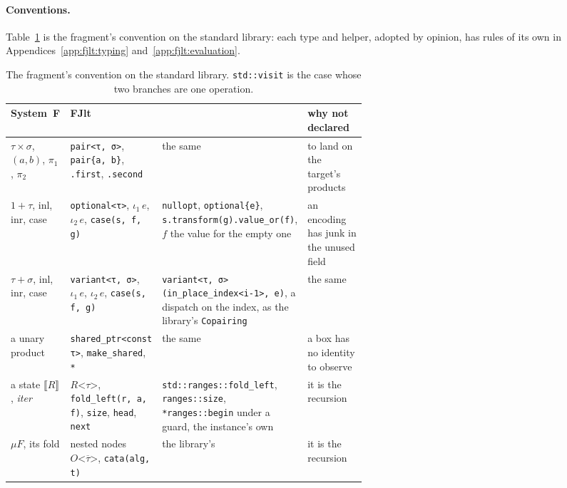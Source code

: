 \paragraph{Conventions.}
Table~\ref{tab:conventions} is the fragment's convention on the standard library: each type and helper, adopted by opinion, has rules of its own in Appendices~\ref{app:fjlt:typing} and~\ref{app:fjlt:evaluation}.

\begin{table}[htbp]
\centering
\small
\begin{tabularx}{\linewidth}{@{}>{\raggedright\arraybackslash}p{0.17\linewidth}>{\raggedright\arraybackslash}p{0.2\linewidth}>{\raggedright\arraybackslash}X>{\raggedright\arraybackslash}p{0.21\linewidth}@{}}
\toprule
System~F & FJlt & \Cpp{} & why not declared \\
\midrule
$\tau \times \sigma$, $(a, b)$, $\pi_1$, $\pi_2$~\cite{pierce1991basic} & \texttt{pair<τ, σ>}, \texttt{pair\{a, b\}}, \texttt{.first}, \texttt{.second} & the same & to land on the target's products \\
$1 + \tau$, inl, inr, case & \texttt{optional<τ>}, $\iota_1\,e$, $\iota_2\,e$, \texttt{case(s, f, g)} & \texttt{nullopt}, \texttt{optional\{e\}}, \texttt{s.transform(g).value\_or(f)}, $f$ the value for the empty one & an encoding has junk in the unused field \\
$\tau + \sigma$, inl, inr, case & \texttt{variant<τ, σ>}, $\iota_1\,e$, $\iota_2\,e$, \texttt{case(s, f, g)} & \texttt{variant<τ, σ>(in\_place\_index<i-1>, e)}, a dispatch on the index, as the library's \texttt{Copairing} & the same \\
a unary product & \texttt{shared\_ptr<const τ>}, \texttt{make\_shared}, \texttt{*} & the same & a box has no identity to observe \\
a state $\llbracket R \rrbracket$, \textit{iter} & $R\texttt{<}\tau\texttt{>}$, \texttt{fold\_left(r, a, f)}, \texttt{size}, \texttt{head}, \texttt{next} & \texttt{std::ranges::fold\_left}, \texttt{ranges::size}, \texttt{*ranges::begin} under a guard, the instance's own & it is the recursion \\
$\mu F$, its fold & nested nodes $O\texttt{<}\overline{\tau}\texttt{>}$, \texttt{cata(alg, t)} & the library's & it is the recursion \\
\bottomrule
\end{tabularx}
\caption{The fragment's convention on the standard library.
\texttt{std::visit} is the case whose two branches are one operation.}
\label{tab:conventions}
\end{table}
